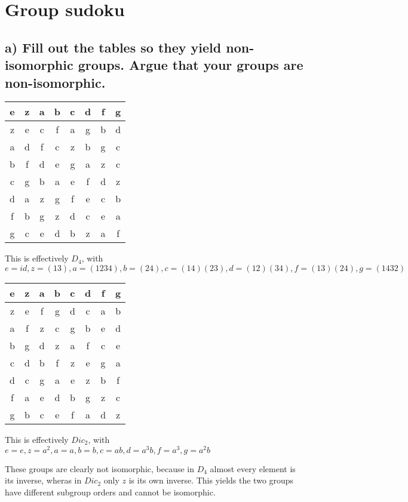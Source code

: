 \section{Group sudoku}

\subsection*{a) Fill out the tables so they yield non-isomorphic groups. Argue that your groups are non-isomorphic.}

\begin{tabular}{|c|c|c|c|c|c|c|c|}\hline
e & z & a & b & c & d & f & g \\\hline
z & e & c & f & a & g & b & d \\\hline
a & d & f & c & z & b & g & c \\\hline
b & f & d & e & g & a & z & c \\\hline
c & g & b & a & e & f & d & z \\\hline
d & a & z & g & f & e & c & b \\\hline
f & b & g & z & d & c & e & a \\\hline
g & c & e & d & b & z & a & f \\\hline
\end{tabular}

This is effectively $D_4$, with $e=id,z=(13),a=(1234),b=(24),c=(14)(23),d=(12)(34),f=(13)(24),g=(1432)$

\begin{tabular}{|c|c|c|c|c|c|c|c|}\hline
e & z & a & b & c & d & f & g \\\hline
z & e & f & g & d & c & a & b \\\hline
a & f & z & c & g & b & e & d \\\hline
b & g & d & z & a & f & c & e \\\hline
c & d & b & f & z & e & g & a \\\hline
d & c & g & a & e & z & b & f \\\hline
f & a & e & d & b & g & z & c \\\hline
g & b & c & e & f & a & d & z \\\hline
\end{tabular}

This is effectively $Dic_2$, with $e=e,z=a^2,a=a,b=b,c=ab,d=a^3b,f=a^3,g=a^2b$

These groups are clearly not isomorphic, because in $D_4$ almost every element is its inverse, wheras in $Dic_2$ only $z$ is its own inverse. This yields the two groups have different subgroup orders and cannot be isomorphic.

